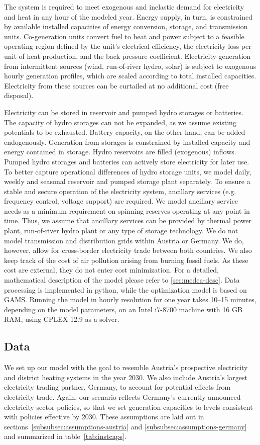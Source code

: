 \documentclass[review, 3p, times, 12pt]{elsarticle} %
\begin{document}
The system is required to meet exogenous and inelastic demand for electricity and heat in any hour of the modeled
year.
Energy supply, in turn, is constrained by available installed capacities of energy conversion, storage, and
transmission units.
Co-generation units convert fuel to heat and power subject to a feasible operating region defined by the unit's
electrical efficiency, the electricity loss per unit of heat production, and the back pressure coefficient.
Electricity generation from intermittent sources (wind, run-of-river hydro, solar) is subject to exogenous hourly
generation profiles, which are scaled according to total installed capacities.
Electricity from these sources can be curtailed at no additional cost (free disposal).

Electricity can be stored in reservoir and pumped hydro storages or batteries.
The capacity of hydro storages can not be expanded, as we assume existing potentials to be exhausted.
Battery capacity, on the other hand, can be added endogenously.
Generation from storages is constrained by installed capacity and energy contained in storage.
Hydro reservoirs are filled (exogenous) inflows.
Pumped hydro storages and batteries can actively store electricity for later use.
To better capture operational differences of hydro storage units, we model daily, weekly and seasonal reservoir and pumped storage plant separately.
To ensure a stable and secure operation of the electricity system, ancillary services (e.g. frequency control,
voltage support) are required.
We model ancillary service needs as a minimum requirement on spinning reserves operating at any point in time.
Thus, we assume that ancillary services can be provided by thermal power plant, run-of-river hydro plant or any
type of storage technology.
We do not model transmission and distribution grids within Austria or Germany.
We do, however, allow for cross-border electricity trade between both countries.
We also keep track of the cost of air pollution arising from burning fossil fuels.
As these cost are external, they do not enter cost minimization.
For a detailed, mathematical description of the model please refer to \ref{sec:medea-desc}.
Data processing is implemented in python, while the optimization model is based on GAMS.
Running the model in hourly resolution for one year takes 10--15 minutes, depending on the model parameters, on an Intel i7-8700 machine with 16 GB RAM, using CPLEX 12.9 as a solver.

\subsection{Data}\label{subsec:data}
We set up our model with the goal to resemble Austria's prospective electricity and district heating systems in the year 2030.
We also include Austria's largest electricity trading partner, Germany, to account for potential effects from electricity trade.
Again, our scenario reflects Germany's currently announced electricity sector policies, so that we set generation capacities to levels consistent with policies effective by 2030.
These assumptions are laid out in sections~\ref{subsubsec:assumptions-austria} and \ref{subsubsec:assumptions-germany} and summarized in table~\ref{tab:instcaps}.
\end{document}
